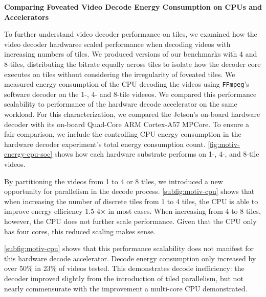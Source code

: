 \motPerceptualEnergy

\textbf{Comparing Foveated Video Decode Energy Consumption on CPUs and Accelerators}

To further understand video decoder performance on tiles, we examined how the video decoder hardwaree scaled performance when decoding videos with increasing numbers of tiles.
We produced versions of our benchmarks with 4 and 8-tiles, distributing the bitrate equally across tiles to isolate how the decoder core executes on tiles without considering the irregularity of foveated tiles.
We measured energy consumption of the CPU decoding the videos using \texttt{FFmpeg}'s software \hevc decoder on the 1-, 4- and 8-tile videeos.
We compared this performance scalability to performance of the hardware decode accelerator on the same workload.
For this characterization, we compared the Jetson's on-board hardware decoder with its on-board Quad-Core ARM Cortex-A57 MPCore.
To ensure a fair comparison, we include the controlling CPU energy consumption in the hardware decoder experiment's total energy consumption count.
\ref{fig:motiv-energy-cpu-soc} shows how each hardware substrate performs on 1-, 4-, and 8-tile videos.

By partitioning the videos from 1 to 4 or 8 tiles, we introduced a new opportunity for parallelism in the decode process.
\ref{subfig:motiv-cpu} shows that when increasing the number of discrete tiles from 1 to 4 tiles, the CPU is able to improve energy efficiency 1.5-4$\times$ in most cases.
When increasing from 4 to 8 tiles, however, the CPU does not further scale performance.
Given that the CPU only has four cores, this reduced scaling makes sense.


%
%
\ref{subfig:motiv-cpu} shows that this performance scalability does not manifest for this hardware decode accelerator.
Decode energy consumption only increased by over 50\% in 23\% of videos tested.
This demonstrates decode inefficiency: the decoder improved slightly from the introduction of tiled parallelism, but not nearly commensurate with the improvement a multi-core CPU demonstrated.

